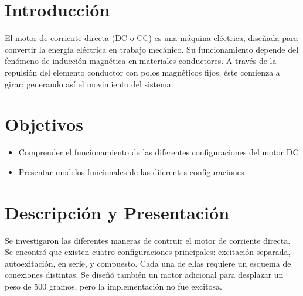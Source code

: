 \section{Introducci\'on}
El motor de corriente directa (DC o CC) es una m\'aquina el\'ectrica, dise\~nada para convertir la energ\'ia el\'ectrica en trabajo
mec\'anico. Su funcionamiento depende del fen\'omeno de inducci\'on magn\'etica en materiales conductores.
A trav\'es de la repulsi\'on del elemento conductor con polos magn\'eticos fijos, \'este comienza a girar; generando
as\'i el movimiento del sistema.

\section{Objetivos}
\begin{itemize}
 \item Comprender el funcionamiento de las diferentes configuraciones del motor DC
 \item Presentar modelos funcionales de las diferentes configuraciones
\end{itemize}

\section{Descripci\'on y Presentaci\'on}
Se investigaron las diferentes maneras de contruir el motor de corriente directa. Se encontr\'o que 
existen cuatro configuraciones principales: excitaci\'on separada, autoexitaci\'on, en serie, y 
compuesto. Cada una de ellas requiere un esquema de conexiones distintas. Se dise\~n\'o tambi\'en un motor 
adicional para desplazar un peso de 500 gramos, pero la implementaci\'on no fue excitosa.